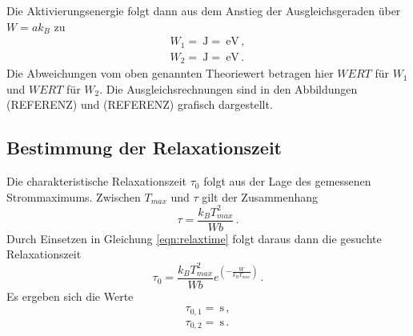 Die Aktivierungsenergie folgt dann aus dem Anstieg der
Ausgleichsgeraden über $W=ak_B$ zu
\begin{align*}
	W_1=\SI{}{\joule}=\SI{}{\eV} \,, \\
	W_2=\SI{}{\joule}=\SI{}{\eV} \,.
\end{align*}
Die Abweichungen vom oben genannten Theoriewert betragen hier
$WERT$ für $W_1$ und $WERT$ für $W_2$. Die Ausgleichsrechnungen sind in den
Abbildungen (REFERENZ) und (REFERENZ) grafisch dargestellt.

\subsection{Bestimmung der Relaxationszeit}

Die charakteristische Relaxationszeit $\tau_0$ folgt aus der Lage des gemessenen Strommaximums.
Zwischen $T_{max}$ und $\tau$ gilt der Zusammenhang
\begin{equation*}
	\tau=\frac{k_B T_{max}^2}{W b} \,.
\end{equation*}
Durch Einsetzen in Gleichung \eqref{eqn:relaxtime} folgt daraus dann die
gesuchte Relaxationszeit
\begin{equation*}
	\tau_0=\frac{k_B T_{max}^2}{W b} e^{\left(-\frac{W}{k_B T_{max}}\right)} \,.
\end{equation*}
Es ergeben sich die Werte
\begin{align}
	\tau_{0,1}=\SI{}{\second} \,, \\
	\tau_{0,2}=\SI{}{\second} \,.
\end{align}
